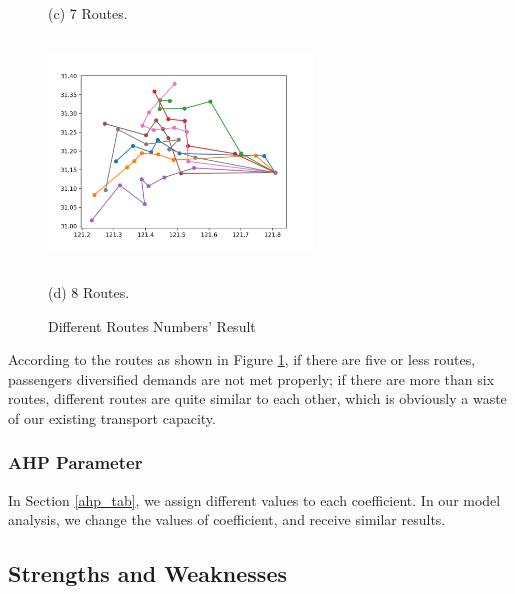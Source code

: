 \documentclass{mcmthesis}
\begin{document}
\begin{figure}[htbp]
\begin{minipage}{0.44\linewidth}
      \caption*{(c) 7 Routes.}
    \end{minipage}
    \hspace{0.7in}
    \begin{minipage}{0.44\linewidth}
      \centerline{\includegraphics[height=6cm,width=7cm]{figures/8routes.png}}
      \caption*{(d) 8 Routes.}
    \end{minipage}
    \caption{Different Routes Numbers' Result}
    \label{diffroutes}
\end{figure}

According to the routes as shown in Figure \ref{diffroutes}, if there are five or less routes, passengers diversified demands are not met properly; if there are more than six routes, different routes are quite similar to each other, which is obviously a waste of our existing transport capacity.

\subsubsection{AHP Parameter}
In Section \ref{ahp_tab}, we assign different values to each coefficient. In our model analysis, we change the values of coefficient, and receive similar results.

\subsection{Strengths and Weaknesses}
\end{document}
